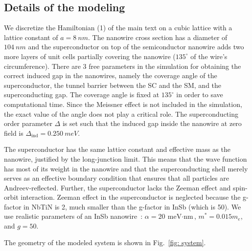 \subsection{Details of the modeling}

We discretize the Hamiltonian (1) of the main text on a cubic lattice with a lattice constant of $a=\SI{8}{nm}$.
The nanowire cross section has a diameter of $\SI{104}{nm}$ and the superconductor on top of the semiconductor nanowire adds two more layers of unit cells partially covering the nanowire ($135^{\circ}$ of the wire's circumference). There are 3 free parameters in the simulation for obtaining the correct induced gap in the nanowires, namely the coverage angle of the superconductor, the tunnel barrier between the SC and the SM, and the superconducting gap. The coverage angle is fixed at $135^{\circ}$ in order to save computational time. Since the Meissner effect is not included in the simulation, the exact value of the angle does not play a critical role. The superconducting order parameter $\Delta$ is set such that the induced gap inside the nanowire at zero field is $\Delta_\textrm{ind} = \SI{0.250}{meV}$.

The superconductor has the same lattice constant and effective mass as the nanowire, justified by the long-junction limit.
This means that the wave function has most of its weight in the nanowire and that the superconducting shell merely serves as an effective boundary condition that ensures that all particles are Andreev-reflected.
Further, the superconductor lacks the Zeeman effect and spin-orbit interaction. Zeeman effect in the superconductor is neglected because the g-factor in NbTiN is 2, much smaller than the g-factor in InSb (which is 50).
We use realistic parameters of an InSb nanowire~\cite{Mourik2012}:  $\alpha=\SI{20}{\meV\cdot\nm}$, $m^{*}=0.015 m_e$, and $g=50$.

The geometry of the modeled system is shown in Fig.~\ref{fig: system}.

